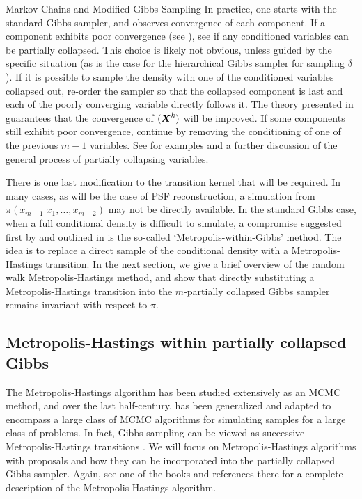 \begin{chapter}{Markov Chains and Modified Gibbs Sampling}
In practice, one starts with the standard Gibbs sampler, and observes convergence of each component.
If a component exhibits poor convergence (see ), see if any conditioned variables can be partially collapsed.
This choice is likely not obvious, unless guided by the specific situation (as is the case for the hierarchical Gibbs sampler for sampling $\delta$).
If it is possible to sample the density with one of the conditioned variables collapsed out, re-order the sampler so that the collapsed component is last and each of the poorly converging variable directly follows it. 
The theory presented in \citep{van2008partially} guarantees that the convergence of $(\mbox{\boldmath$X$}^k)$ will be improved.
If some components still exhibit poor convergence, continue by removing the conditioning of one of the previous $m-1$ variables.
See \citep{van2008partially} for examples and a further discussion of the general process of partially collapsing variables.

There is one last modification to the transition kernel that will be required.
In many cases, as will be the case of PSF reconstruction, a simulation from $\pi(x_{m-1}|x_1,\dots, x_{m-2})$ may not be directly available.
In the standard Gibbs case, when a full conditional density is difficult to simulate, a compromise suggested first by \citep{muller1992alternatives} and outlined in \citep{robert2013monte} is the so-called `Metropolis-within-Gibbs' method.
The idea is to replace a direct sample of the conditional density with a Metropolis-Hastings transition. 
In the next section, we give a brief overview of the random walk Metropolis-Hastings method, and show that directly substituting a Metropolis-Hastings transition into the $m$-partially collapsed Gibbs sampler remains invariant with respect to $\pi$.

\subsection{Metropolis-Hastings within partially collapsed Gibbs}
The Metropolis-Hastings algorithm \citep{metropolis1953equation} has been studied extensively as an MCMC method, and over the last half-century, has been generalized and adapted to encompass a large class of MCMC algorithms for simulating samples for a large class of problems. 
In fact, Gibbs sampling can be viewed as successive Metropolis-Hastings transitions \citep{robert2013monte}.
We will focus on Metropolis-Hastings algorithms with proposals and how they can be incorporated into the partially collapsed Gibbs sampler.
Again, see one of the books \citep{calvetti2007introduction,liu2008monte,robert2013monte} and references there for a complete description of the Metropolis-Hastings algorithm.


\end{chapter}
